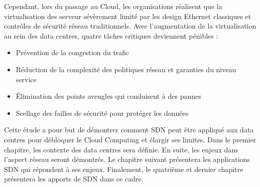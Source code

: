 \par
Cependant, lors du passage au Cloud, les organisations réalisent que la virtualisation des serveur sévèrement limité par les design Ethernet classiques et contrôles de sécurité réseau traditionnels. Avec l'augmentation de la virtualisation au sein des data centres, quatre tâches critiques deviennent pénibles :
\begin{itemize}
\item Prévention de la congestion du trafic 
\item Réduction de la complexité des politiques réseau et garanties du niveau service
\item Élimination des points aveugles qui conduisent à des pannes
\item  Scellage des failles de sécurité pour protéger les données
\end{itemize}

\par
Cette étude a pour but de démontrer comment SDN peut être appliqué aux data centres pour débloquer le Cloud Computing et élargir ses limites. Dans le premier chapitre, les contexte des data centres sera définie. En suite, les enjeux dans l'aspect réseau seront démontrés. Le chapitre suivant présentera les applications SDN qui répondent à ses enjeux. Finalement, le quatrième et dernier chapitre présentera les apports de SDN dans ce cadre.

